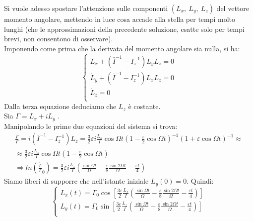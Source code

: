 \documentclass[../main.tex]{subfiles}
\begin{document}
Si vuole adesso spostare l'attenzione sulle componenti $(L_x, \ L_y, \ L_z)$ del vettore momento angolare, mettendo in luce cosa accade alla stella  per tempi molto lunghi (che le approssimazioni della precedente soluzione, esatte solo per tempi brevi, non consentono di osservare). \\
Imponendo come prima che la derivata del momento angolare sia nulla, si ha:
\begin{equation*}
\begin{cases}
	\displaystyle \dot L_x+(\bar I^{-1}-I_z^{-1}) L_yL_z=0\\
           \displaystyle \dot L_y+(\bar I^{-1}-I_z^{-1}) L_xL_z=0\\
           \displaystyle \dot L_z=0\\
\end{cases}
\end{equation*}
Dalla terza equazione deduciamo che $L_z$ è costante. \\
Sia $\Gamma=L_x+iL_y$ .\\
 Manipolando le prime due equazioni del sistema si trova: 
\begin{gather*}
	\displaystyle \frac{\dot\Gamma}\Gamma=i(\bar I^{-1}-I_z^{-1})L_z=
           \frac{3}{2}  \varepsilon i\frac{L_z}{I}\cos \Omega t\left (1-\frac \varepsilon 2 \cos\Omega t\right)^{-1} \left( 1+\varepsilon      \cos\Omega t\right)^{-1}\approx \\ \approx
           \frac{3}{2}  \varepsilon i\frac{L_z}{I}\cos \Omega t\left (1-\frac \varepsilon 2 \cos\Omega t\right) \\
            \Longrightarrow ln\left(\frac{\dot\Gamma}\Gamma_0\right)= \frac{3}{2}  \varepsilon i\frac{L_z}{I}\left (\frac{\sin \Omega t}{\Omega}- \frac{\varepsilon}{8} \frac{\sin 2 \Omega t}{\Omega}-\frac{\varepsilon t}{4}\right)
\end{gather*}
Siamo liberi di supporre che nell'istante iniziale $L_y(0)=0$. Quindi:
\begin{equation*}
\begin{cases}
		\displaystyle L_x(t)=\Gamma_0 \cos \left[\frac{3\varepsilon }{2} \frac{L_z}{I}\left (\frac{\sin \Omega t}{\Omega}- \frac{\varepsilon}{8} \frac{\sin 2 \Omega t}{\Omega}-\frac{\varepsilon t}{4}\right) \right] \\
                     \displaystyle L_y(t)=\Gamma_0 \sin \left[\frac{3\varepsilon }{2} \frac{L_z}{I}\left (\frac{\sin \Omega t}{\Omega}- \frac{\varepsilon}{8} \frac{\sin 2 \Omega t}{\Omega}-\frac{\varepsilon t}{4}\right) \right] \\
	\end{cases}
\end{equation*}
\end{document}
